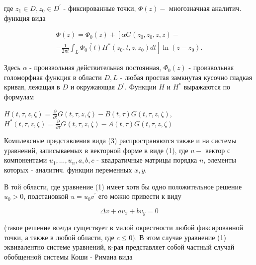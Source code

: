 \documentclass[10pt]{article}
\begin{document}
где $z_{1} \in D, z_{0} \in D^{\prime}$ - фиксированные точки, $\Phi(z)-$ многозначная аналитич. функция вида



\[

\begin{gathered}

\Phi(z)=\Phi_{0}(z)+\left[\alpha G\left(z_{0}, \overline{z_{0}}, z, \bar{z}\right)-\right. \\

\left.-\frac{1}{2 \pi i} \int_{L} \overline{\Phi_{0}(t)} H^{*}\left(z_{0}, t, z, \overline{z_{0}}\right) d t\right] \ln \left(z-z_{0}\right) .

\end{gathered}

\]



Здесь $\alpha$ - произвольная действительная постоянная, $\Phi_{0}(z)$ - произвольная голоморфная функция в области $D, L$ - любая простая замкнутая кусочно гладкая кривая, лежащая в $D$ и окружающая $D^{\prime}$. Функции $H$ и $H^{*}$ выражаются по формулам



$H(t, \tau, z, \zeta)=\frac{\partial}{\partial t} G(t, \tau, z, \zeta)-B(t, \tau) G(t, \tau, z, \zeta)$, $H^{*}(t, \tau, z, \zeta)=\frac{\partial}{\partial \tau} G(t, \tau, z, \zeta)-A(t, \tau) G(t, \tau, z, \zeta)$



Комплексные представления вида (3) распространяются также и на системы уравнений, записываемых в векторной форме в виде (1), где $u-$ вектор с компонентами $u_{1}, \ldots, u_{n}, a, b, c$ - квадратичные матрицы порядка $n$, элементы которых - аналитич. функции переменных $x, y$.



В той области, где уравнение (1) имеет хотя бы одно положительное решение $u_{0}>0$, подстановкой $u=u_{0} v^{\prime}$ его можно привести к виду



\[

\Delta v+a v_{x}+b v_{y}=0

\]



(такое решение всегда существует в малой окрестности любой фиксированной точки, а также в любой области, где $c \leqslant 0)$. В этом случае уравнение (1) эквивалентно системе уравнений, к-рая представляет собой частный случай обобщенной системы Коши - Римана вида
\end{document}
